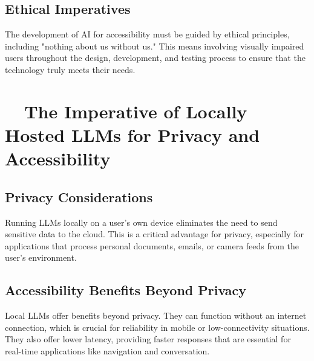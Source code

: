 \subsection{Ethical Imperatives}\label{ch9:ssec:ethical-imperatives}
The development of AI for accessibility must be guided by ethical principles, including "nothing about us without us." This means involving visually impaired users throughout the design, development, and testing process to ensure that the technology truly meets their needs.

\section{~~The Imperative of Locally Hosted LLMs for Privacy and Accessibility}\label{ch9:sec:local-llms}

\subsection{Privacy Considerations}\label{ch9:ssec:local-llm-privacy}
Running LLMs locally on a user's own device eliminates the need to send sensitive data to the cloud. This is a critical advantage for privacy, especially for applications that process personal documents, emails, or camera feeds from the user's environment.

\subsection{Accessibility Benefits Beyond Privacy}\label{ch9:ssec:local-llm-benefits}
Local LLMs offer benefits beyond privacy. They can function without an internet connection, which is crucial for reliability in mobile or low-connectivity situations. They also offer lower latency, providing faster responses that are essential for real-time applications like navigation and conversation.

